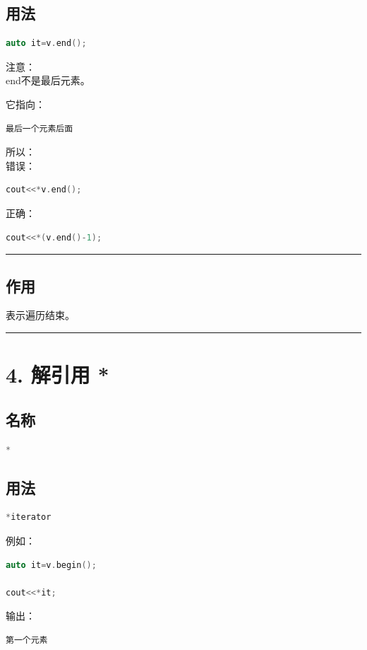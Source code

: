 \documentclass[10pt,twocolumn]{extarticle}
\begin{document}
\subsection{用法}
\begin{lstlisting}[language=C++]
auto it=v.end();
\end{lstlisting}
注意：\\
end不是最后元素。

它指向：
\begin{lstlisting}
最后一个元素后面
\end{lstlisting}
所以：\\
错误：
\begin{lstlisting}[language=C++]
cout<<*v.end();
\end{lstlisting}
正确：
\begin{lstlisting}[language=C++]
cout<<*(v.end()-1);
\end{lstlisting}

\noindent\rule{\linewidth}{0.4pt}

\subsection{作用}
表示遍历结束。

\noindent\rule{\linewidth}{0.4pt}

\section{4. 解引用 *}

\subsection{名称}
\begin{lstlisting}[language=C++]
*
\end{lstlisting}

\subsection{用法}
\begin{lstlisting}[language=C++]
*iterator
\end{lstlisting}
例如：
\begin{lstlisting}[language=C++]
auto it=v.begin();

cout<<*it;
\end{lstlisting}
输出：
\begin{lstlisting}
第一个元素
\end{lstlisting}
\end{document}
